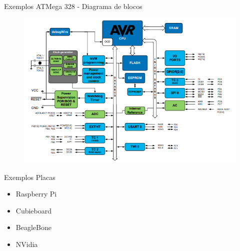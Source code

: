 \documentclass[t]{beamer}
\begin{document}
\begin{frame}{Exemplos}
ATMega 328 - Diagrama de blocos
\begin{figure}
\includegraphics[width=\linewidth]{atmega328-blockdiagram}
\end{figure}
\end{frame}

\begin{frame}{Exemplos}
Placas
\begin{itemize}
\item Raspberry Pi
\item Cubieboard
\item BeagleBone
\item NVidia
\end{itemize}
\end{frame}

\frame{\titlepage}
\end{document}

